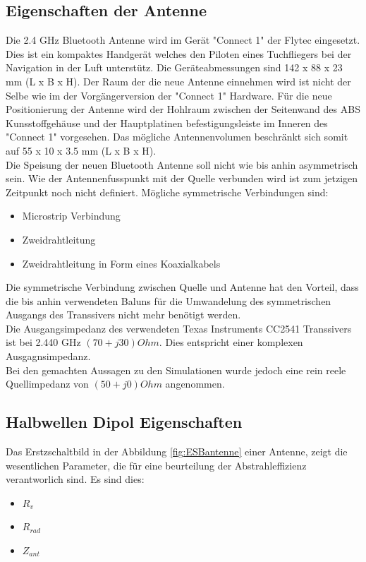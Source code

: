 \subsection{Eigenschaften der Antenne}\label{sec:EigenschaftenAntenne}
Die 2.4 GHz Bluetooth Antenne wird im Gerät "Connect 1" der Flytec eingesetzt. Dies ist ein kompaktes Handgerät welches den Piloten eines Tuchfliegers bei der Navigation in der Luft unterstütz. Die Geräteabmessungen sind 142 x 88 x 23 mm (L x B x H). Der Raum der die neue Antenne einnehmen wird ist nicht der Selbe wie im der Vorgängerversion der "Connect 1" Hardware. Für die neue Positionierung der Antenne wird der Hohlraum zwischen der Seitenwand des ABS Kunsstoffgehäuse und der Hauptplatinen befestigungsleiste im Inneren des "Connect 1" vorgesehen. Das mögliche Antennenvolumen beschränkt sich somit auf 55 x 10 x 3.5 mm (L x B x H).\\
Die Speisung der neuen Bluetooth Antenne soll nicht wie bis anhin asymmetrisch sein. Wie der Antennenfusspunkt mit der Quelle verbunden wird ist zum jetzigen Zeitpunkt noch nicht definiert. Mögliche symmetrische Verbindungen sind:

\begin{itemize}
\item Microstrip Verbindung  
\item Zweidrahtleitung
\item Zweidrahtleitung in Form eines Koaxialkabels
\end{itemize}

Die symmetrische Verbindung zwischen Quelle und Antenne hat den Vorteil, dass die bis anhin verwendeten Baluns für die Umwandelung des symmetrischen Ausgangs des Transsivers nicht mehr benötigt werden. \\
Die Ausgangsimpedanz des verwendeten Texas Instruments CC2541 Transsivers ist bei 2.440 GHz $(70+j30) Ohm$. Dies entspricht einer komplexen Ausgagnsimpedanz. \\Bei den gemachten Aussagen zu den Simulationen wurde jedoch eine rein reele Quellimpedanz von $(50+j0) Ohm$ angenommen.




\subsection{Halbwellen Dipol Eigenschaften}
Das Erstzschaltbild in der Abbildung \ref{fig:ESBantenne} einer Antenne, zeigt die wesentlichen Parameter, die für eine beurteilung der Abstrahleffizienz verantworlich sind. Es sind dies:
\begin{itemize}
\item $R_{v}$
\item $R_{rad}$
\item $Z_{ant}$
\end{itemize}

